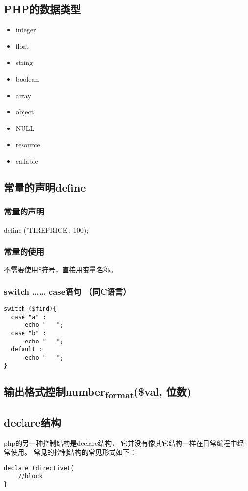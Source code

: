 \documentclass[11pt]{article}
\begin{document}
\subsection{PHP的数据类型}
\label{sec:orgca55a68}
\begin{itemize}
\item integer
\item float
\item string
\item boolean
\item array
\item object
\item NULL
\item resource
\item callable
\end{itemize}
\subsection{常量的声明define}
\label{sec:orgbfcc744}
\subsubsection{常量的声明}
\label{sec:org6ae5d9c}
define ('TIREPRICE', 100);
\subsubsection{常量的使用}
\label{sec:org2ec6a22}
不需要使用\$符号，直接用变量名称。
\subsubsection{switch …… case语句 （同C语言）}
\label{sec:orga90b33e}
\begin{verbatim}
switch ($find){
  case "a" :
      echo "   ";
  case "b" :
      echo "   ";
  default :
      echo "   ";
}
\end{verbatim}
\subsection{输出格式控制number\textsubscript{format}(\$val, 位数)}
\label{sec:orgb466aa0}

\subsection{declare结构}
\label{sec:org0bc2b22}
php的另一种控制结构是declare结构， 它并没有像其它结构一样在日常编程中经常使用。 常见的控制结构的常见形式如下：
\begin{verbatim}
declare (directive){
    //block
}
\end{verbatim}
\end{document}
